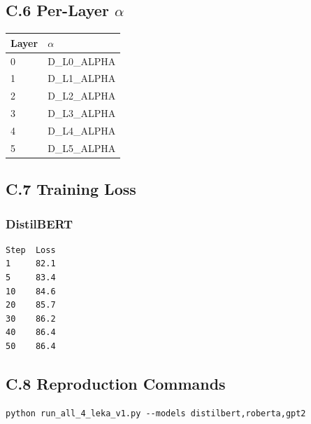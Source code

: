 \subsection{C.6 Per-Layer $\alpha$}

\begin{table}[H]
\centering
\small
\begin{tabular}{ll}
\toprule
\textbf{Layer} & \textbf{$\alpha$} \\
\midrule
0 & {{D\_L0\_ALPHA}} \\
1 & {{D\_L1\_ALPHA}} \\
2 & {{D\_L2\_ALPHA}} \\
3 & {{D\_L3\_ALPHA}} \\
4 & {{D\_L4\_ALPHA}} \\
5 & {{D\_L5\_ALPHA}} \\
\bottomrule
\end{tabular}
\end{table}

\subsection{C.7 Training Loss}

\subsubsection{DistilBERT}
\begin{lstlisting}
Step  Loss
1     82.1
5     83.4
10    84.6
20    85.7
30    86.2
40    86.4
50    86.4
\end{lstlisting}

\subsection{C.8 Reproduction Commands}

\begin{lstlisting}
python run_all_4_leka_v1.py --models distilbert,roberta,gpt2
\end{lstlisting}

